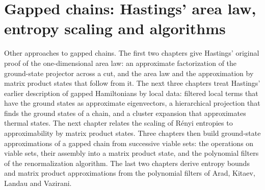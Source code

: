 \part{Gapped chains: Hastings' area law, entropy scaling and algorithms}
\label{part:gapped_chains}

Other approaches to gapped chains. The first two chapters give Hastings'
original proof of the one-dimensional area law: an approximate factorization
of the ground-state projector across a cut, and the area law and the
approximation by matrix product states that follow from it. The next three
chapters treat Hastings' earlier description of gapped Hamiltonians by local
data: filtered local terms that have the ground states as approximate
eigenvectors, a hierarchical projection that finds the ground states of a
chain, and a cluster expansion that approximates thermal states. The next
chapter relates the scaling of R\'enyi entropies to approximability by matrix
product states. Three chapters then build ground-state approximations of a
gapped chain from successive viable sets: the operations on viable sets, their
assembly into a matrix product state, and the polynomial filters of the
renormalization algorithm. The last two chapters derive entropy bounds and
matrix product approximations from the polynomial filters of Arad, Kitaev,
Landau and Vazirani.
